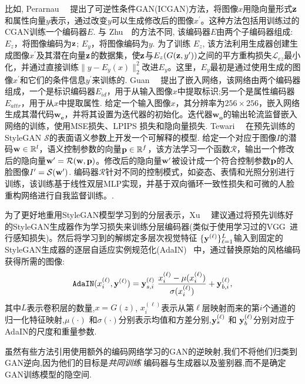 比如, Perarnau~\etal~\cite{perarnau2016invertible} 提出了可逆性条件GAN(ICGAN)方法，将图像$x$用隐向量形式$\mathbf{z}$和属性向量$y$表示，通过改变$y$可以生成修改后的图像$x^{\prime}$。这种方法包括用训练过的CGAN训练一个编码器$E$. 
与 Zhu~\etal~\cite{zhu2016generative}的方法不同, 该编码器$E$由两个子编码器组成:$E_{z}$，将图像编码为$\mathbf{z}$; $E_{y}$，将图像编码为$y$. 
为了训练 $E_{z}$, 该方法利用生成器创建生成图像$x^{\prime}$及其潜在向量$\mathbf{z}$的数据集，使$\mathbf{z}$与$E_{z}(G(\mathbf{z}, y^{\prime}))$之间的平方重构损失$\mathcal{L}_{ez}$最小化，并通过直接训练$\|y-E_{y}(x)\|_{2}^{2}$改进$E_{y}$。这里，$E_{y}$最初是通过使用生成的图像$x^{\prime}$和它们的条件信息$y^{\prime}$来训练的.
Guan~\etal~\cite{guan2020faster} 提出了嵌入网络，该网络由两个编码器组成，一个是标识编码器$E_{id}$，用于从输入图像$x$中提取标识;另一个是属性编码器$E_{attr}$，用于从$x$中提取属性. 
给定一个输入图像$x$，其分辨率为$256 \times 256$，嵌入网络生成其潜代码$\mathbf{w_e}$，并将其设置为迭代器的初始化。迭代器$\mathbf{w_o}$的输出轮流监督嵌入网络的训练，使用MSE损失、LPIPS 损失和隐向量损失.
Tewari~\etal~\cite{tewari2020stylerig} 在预先训练的StyleGAN $\mathcal{S}$的表面语义参数上开发一个可解释的模型.
给定一个对应于图像$I$的潜码$\mathbf{w} \in \mathbb{R}^{l}$，语义控制参数的向量$\mathbf{p} \in \mathbb{R}^f$，该方法学习一个函数$\mathcal{R}$，输出一个修改后的隐向量${\mathbf{w}}^{\prime} = \mathcal{R}(\mathbf{w}, \mathbf{p})$。修改后的隐向量$\mathbf{w}^{\prime}$被设计成一个符合控制参数$\mathbf{p}$的人脸图像$I^{\prime} = \mathcal{S}({\mathbf{w}}^{\prime})$.
编码器$\mathcal{R}$针对不同的控制模式，如姿态、表情和光照分别进行训练，该训练基于线性双层MLP实现，并基于双向循环一致性损失和可微的人脸重构网络进行自我监督训练。.

为了更好地重用StyleGAN模型学习到的分层表示，Xu~\etal~\cite{xu2020ghfeat} 建议通过将预先训练好的StyleGAN生成器作为学习损失来训练分层编码器(类似于使用学习过的VGG~\cite{simonyan2014very}进行感知损失)。然后将学习到的解绑定多层次视觉特征 $\{\mathbf{y}^{(\ell)}\}^L_{\ell=1}$输入到固定的StyleGAN生成器的逐层自适应实例规范化(AdaIN)~\cite{huang2017adain} 中，通过替换原始的风格编码获得所需的图像:
\begin{equation}
\mathtt{AdaIN}({x}_i^{(\ell)}, \y^{(\ell)}) = \y_{s,i}^{(\ell)}\ \frac{{x}_i^{(\ell)} - \mu({x}_i^{(\ell)})}{\sigma({x}_i^{(\ell)})} + \y_{b,i}^{(\ell)},
\label{eq:adain}  
\end{equation}
其中$L$表示卷积层的数量,${x}=G(z)$, ${x}_i^{(\ell)}$表示从第$\ell$层映射而来的第$i$个通道的归一化特征映射,$\mu(\cdot)$ 和$\sigma(\cdot)$分别表示均值和方差分别,$\mathbf{y}_s^{(\ell)}$ 和 $\mathbf{y}_b^{(\ell)}$分别对应于AdaIN的尺度和重量参数.

虽然有些方法\cite{donahue2016adversarial,dumoulin2016adversarially}引用使用额外的编码网络学习的GAN的逆映射,我们不将他们归类到GAN逆向,因为他们的目标是\emph{共同训练} 编码器与生成器以及鉴别器,而不是确定GAN训练模型的隐空间.

